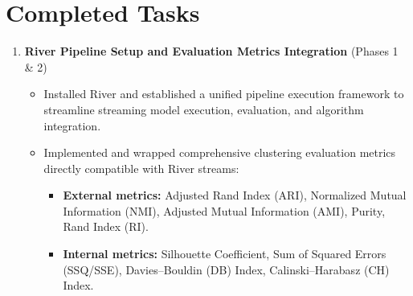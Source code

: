 \section{Completed Tasks}
\label{sec:completed}

\begin{enumerate}[label=\textbf{C\arabic*.},leftmargin=2.2em]
  \item \textbf{River Pipeline Setup and Evaluation Metrics Integration} \hfill{\small(Phases 1 \& 2)}\\
  \begin{itemize}[leftmargin=1.2em,itemsep=2pt,topsep=1pt]
    \item Installed River and established a unified pipeline execution framework to streamline streaming model execution, evaluation, and algorithm integration.
    \item Implemented and wrapped comprehensive clustering evaluation metrics directly compatible with River streams:
    \begin{itemize}[leftmargin=1.2em,itemsep=1pt]
      \item \textbf{External metrics:} Adjusted Rand Index (ARI), Normalized Mutual Information (NMI), Adjusted Mutual Information (AMI), Purity, Rand Index (RI).
      \item \textbf{Internal metrics:} Silhouette Coefficient, Sum of Squared Errors (SSQ/SSE), Davies--Bouldin (DB) Index, Calinski--Harabasz (CH) Index.
    \end{itemize}
  \end{itemize}


\end{enumerate}
